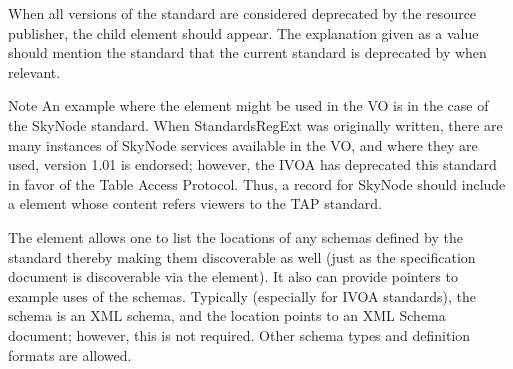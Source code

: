 \documentclass[11pt,a4paper]{ivoa}
\begin{document}

When all versions of the standard are considered deprecated by the
resource publisher, the  child element
should appear.  The explanation given as a value should mention the
standard that the current standard is deprecated by when relevant.  

\begin{admonition}{Note}
An example where the  element
might be used in the VO is in the case of the SkyNode standard.
When StandardsRegExt was originally written, there are
many instances of SkyNode services available in the VO, and where 
they are used, version 1.01 is endorsed; however, the IVOA has
deprecated this standard in favor of the Table Access
Protocol.  Thus, a
 record for
SkyNode should include a 
element whose content refers viewers to the TAP standard.  
\end{admonition}

The  element allows one to
list the locations of any schemas defined by the standard thereby making
them discoverable as well (just as the specification document is
discoverable via the 
element).  It also can provide pointers to example uses of the
schemas.  Typically (especially for IVOA standards), the schema is an
XML schema, and the location points to an XML Schema document; however, this is not required.
Other schema types and definition formats are allowed.
\end{document}
